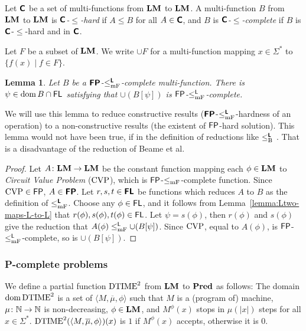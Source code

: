 \documentclass{article}
\newtheorem{lemma}[theorem]{Lemma}
\theoremstyle{definition}
\theoremstyle{remark}
\begin{document}
Let $\text{\bfseries \sffamily \upshape C}$ be a set of multi-functions from $\mathbf{LM}$ to $\mathbf{LM}$.
A multi-function $B$ from $\mathbf{LM}$ to $\mathbf{LM}$ is \emph{$\text{\bfseries \sffamily \upshape C}$-$\leq$-hard} if $A \leq B$ for all $A \in \text{\bfseries \sffamily \upshape C}$,
and $B$ is \emph{$\text{\bfseries \sffamily \upshape C}$-$\leq$-complete} 
if $B$ is $\text{\bfseries \sffamily \upshape C}$-$\leq$-hard and in $\text{\bfseries \sffamily \upshape C}$.

Let $F$ be a subset of $\mathbf{LM}$.
We write $\cup F$ for a multi-function mapping $x \in \Sigma^*$ to 
$\{f(x) \mid f \in F\}$.

\begin{lemma}
\label{lemma:P-complete}
Let $B$ be a $\text{\bfseries \sffamily \upshape FP}$-$\leq _{\mathrm{mF}} ^{\text{\bfseries \sffamily \upshape L}}$-complete multi-function.
There is $\psi \in \mathop{\rm dom} B \cap \mathsf{FL}$ satisfying that
 $\cup (B[\psi])$ is $\mathsf{FP}$-$\le^{\mathsf{L}}_{\mathrm{mF}}$-complete.
\end{lemma}

We will use this lemma to reduce constructive results
($\text{\bfseries \sffamily \upshape FP}$-$\leq _{\mathrm{mF}} ^{\text{\bfseries \sffamily \upshape L}}$-hardness of an operation) to a non-constructive 
results (the existent of $\mathsf{FP}$-hard solution).
This lemma would not have been true, if in the definition 
of reductions like $\leq _{\mathrm B} ^{\text{\bfseries \sffamily \upshape L}}$ \cite[Lemma~3.6]{kawamura2012complexity}.
That is a disadvantage of the reduction of Beame et al.

\begin{proof}
Let $A \colon \mathbf{LM} \to \mathbf{LM}$ be the constant function mapping each $\phi \in \mathbf{LM}$ to \emph{Circuit Value Problem} ($\mathrm{CVP}$), which is $\mathsf{FP}$-$\leq _{\mathrm{mF}}$-complete function.
Since $\mathrm{CVP} \in \mathsf{FP}$, $A \in \text{\bfseries \sffamily \upshape FP}$.
Let $r, s, t \in \text{\bfseries \sffamily \upshape FL}$ be functions which reduces $A$ to $B$
as the definition of $\leq _{\mathrm{mF}} ^{\text{\bfseries \sffamily \upshape L}}$.
Choose any $\phi \in \mathsf{FL}$, and it follows from Lemma~\ref{lemma:Ltwo-maps-L-to-L}
that $r(\phi), s(\phi), t(\phi) \in \mathsf{FL}$.
Let $\psi = s(\phi)$, then $r(\phi)$ and $s(\phi)$ give the reduction that
$A(\phi) \leq _{\mathrm{mF}}^{\mathsf{L}} \cup (B[\psi])$.
Since $\mathrm{CVP}$, equal to $A(\phi)$, is $\mathsf{FP}$-$\leq _{\mathrm{mF}}^{\mathsf{L}}$-complete,
so is $\cup (B[\psi])$.
\end{proof}


\subsubsection{P-complete problems}

We define a partial function $\mathrm{DTIME}^2$ from $\mathbf{LM}$ to $\mathbf{Pred}$ as follows:
The domain $\mathop{\rm dom} \mathrm{DTIME}^2$ is a set of $\langle M, \overline \mu, \phi \rangle$
such that $M$ is a (program of) machine, $\mu \colon \mathbb N \to \mathbb N$ is non-decreasing, $\phi \in \mathbf{LM}$, and $M^\phi(x)$ stops in $\mu(|x|)$ steps for all $x \in \Sigma^*$.
$\mathrm{DTIME}^2(\langle M, \overline \mu, \phi \rangle)(x)$ is $1$ if
$M^\phi(x)$ accepts, otherwise it is 0.
\end{document}
